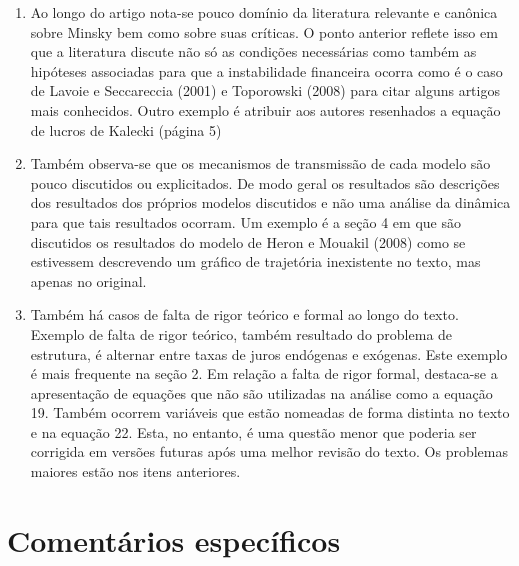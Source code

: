 \documentclass[11pt]{article}
\begin{document}
\begin{enumerate}
\item Ao longo do artigo nota-se pouco domínio da literatura relevante e canônica sobre Minsky bem como sobre suas críticas. O ponto anterior reflete isso em que a literatura discute não só as condições necessárias como também as hipóteses associadas para que a instabilidade financeira ocorra como é o caso de Lavoie e Seccareccia (2001) e Toporowski (2008) para citar alguns artigos mais conhecidos.
Outro exemplo é atribuir aos autores resenhados a equação de lucros de Kalecki (página 5)
\item Também observa-se que os mecanismos de transmissão de cada modelo são pouco discutidos ou explicitados. De modo geral os resultados são descrições dos resultados dos próprios modelos discutidos e não uma análise da dinâmica para que tais resultados ocorram. Um exemplo é a seção 4 em que são discutidos os resultados do modelo de Heron e Mouakil (2008) como se estivessem descrevendo um gráfico de trajetória inexistente no texto, mas apenas no original.
\item Também há casos de falta de rigor teórico e formal ao longo do texto.
Exemplo de falta de rigor teórico, também resultado do problema de estrutura, é alternar entre taxas de juros endógenas e exógenas.
Este exemplo é mais frequente na seção 2.
Em relação a falta de rigor formal, destaca-se a apresentação de equações que não são utilizadas na análise como a equação 19.
Também ocorrem variáveis que estão nomeadas de forma distinta no texto e na equação 22.
Esta, no entanto, é uma questão menor que poderia ser corrigida em versões futuras após uma melhor revisão do texto.
Os problemas maiores estão nos itens anteriores.
\end{enumerate}

\section*{Comentários específicos}
\label{sec:org48d7cb9}
\end{document}
